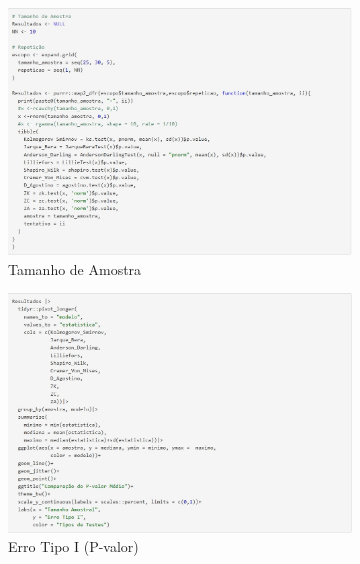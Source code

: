 \documentclass[final]{beamer}
\begin{document}
\begin{frame}[t]
\begin{columns}[t,totalwidth=0.6\paperwidth]
\begin{column}{0.45\textwidth}
\begin{figure}[H]
    \centering
    \begin{subfigure}[b]{0.32\linewidth}
        \centering
        \includegraphics[width=\linewidth]{fig1_simulacao.jpg}
        \caption{Tamanho de Amostra}
        \label{fig:simulacao1}
    \end{subfigure}
    \hfill
    \begin{subfigure}[b]{0.33\linewidth}
        \centering
        \includegraphics[width=\linewidth]{fig2_simulacao.jpg}
        \caption{Erro Tipo I (P-valor)}
        \label{fig:simulacao2}
    \end{subfigure}
    \hfill
    \begin{subfigure}[b]{0.33\linewidth}

\end{subfigure}
\end{figure}
\end{column}
\end{columns}
\end{frame}
\end{document}
